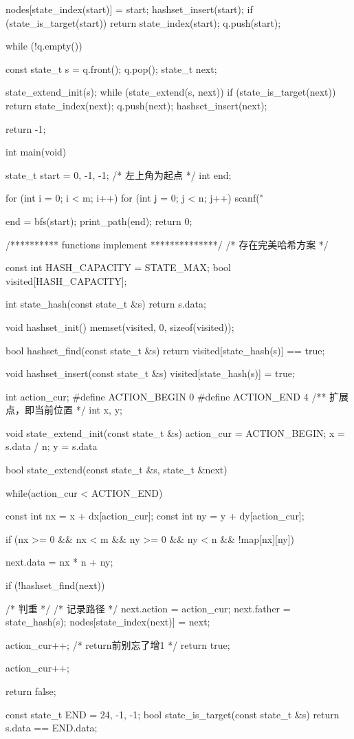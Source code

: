 \begin{Codex}[label=maze.c]
{    nodes[state_index(start)] = start;
    hashset_insert(start);
    if (state_is_target(start))
        return state_index(start);
    q.push(start);

    while (!q.empty()) {
        const state_t s = q.front(); q.pop();
        state_t next;

        state_extend_init(s);
        while (state_extend(s, next)) {
            if (state_is_target(next)) {
                return state_index(next);
            }
            q.push(next);
            hashset_insert(next);
        }
    }
    return -1;
}

int main(void) {
    state_t start = {0, -1, -1}; /* 左上角为起点 */
    int end;

    for (int i = 0; i < m; i++) {
        for (int j = 0; j < n; j++) {
            scanf("%
        }
    }

    end = bfs(start);
    print_path(end);
    return 0;
}

/********** functions implement **************/
/* 存在完美哈希方案 */

const int HASH_CAPACITY = STATE_MAX;
bool visited[HASH_CAPACITY];

int state_hash(const state_t &s) {
    return s.data;
}

void hashset_init() {
    memset(visited, 0, sizeof(visited));
}

bool hashset_find(const state_t &s) {
    return visited[state_hash(s)] == true;
}

void hashset_insert(const state_t &s) {
    visited[state_hash(s)] = true;
}

int action_cur;
#define ACTION_BEGIN 0
#define ACTION_END 4
/** 扩展点，即当前位置 */
int x, y;

void state_extend_init(const state_t &s) {
    action_cur = ACTION_BEGIN;
    x = s.data / n;
    y = s.data %
}

bool state_extend(const state_t &s, state_t &next) {
    while(action_cur < ACTION_END) {
        const int nx = x + dx[action_cur];
        const int ny = y + dy[action_cur];

        if (nx >= 0 && nx < m && ny >= 0 && ny < n && !map[nx][ny]) {
            next.data = nx * n + ny;

            if (!hashset_find(next)) { /* 判重 */
                /* 记录路径 */
                next.action = action_cur;
                next.father = state_hash(s);
                nodes[state_index(next)] = next;

                action_cur++;  /* return前别忘了增1 */
                return true;
            }
        }
        action_cur++;
    }
    return false;
}

const state_t END = {24, -1, -1};
bool state_is_target(const state_t &s) {
    return s.data == END.data;
}
\end{Codex}

